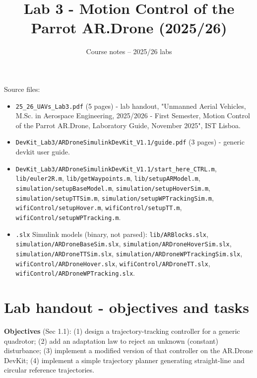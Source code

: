 \documentclass[11pt]{article}
\title{Lab 3 - Motion Control of the Parrot AR.Drone (2025/26)}
\author{Course notes -- 2025/26 labs}
\date{}
\begin{document}
\maketitle
\tableofcontents
\vspace{1em}

Source files:
\begin{itemize}
\item \texttt{25\_\allowbreak{}26\_\allowbreak{}UAVs\_\allowbreak{}Lab3.pdf} (5 pages) - lab handout, "Unmanned Aerial Vehicles, M.Sc. in Aerospace Engineering, 2025/2026 - First Semester, Motion Control of the Parrot AR.Drone, Laboratory Guide, November 2025", IST Lisboa.
\item \texttt{DevKit\_\allowbreak{}Lab3/\allowbreak{}ARDroneSimulinkDevKit\_\allowbreak{}V1.1/guide.pdf} (3 pages) - generic devkit user guide.
\item \texttt{DevKit\_\allowbreak{}Lab3/\allowbreak{}ARDroneSimulinkDevKit\_\allowbreak{}V1.1/start\_\allowbreak{}here\_\allowbreak{}CTRL.m}, \texttt{lib/\allowbreak{}euler2R.m}, \texttt{lib/\allowbreak{}getWaypoints.m}, \texttt{lib/\allowbreak{}setupARModel.m}, \texttt{simulation/\allowbreak{}setupBaseModel.m}, \texttt{simulation/\allowbreak{}setupHoverSim.m}, \texttt{simulation/\allowbreak{}setupTTSim.m}, \texttt{simulation/\allowbreak{}setupWPTrackingSim.m}, \texttt{wifiControl/\allowbreak{}setupHover.m}, \texttt{wifiControl/\allowbreak{}setupTT.m}, \texttt{wifiControl/\allowbreak{}setupWPTracking.m}.
\item \texttt{.slx} Simulink models (binary, not parsed): \texttt{lib/ARBlocks.slx}, \texttt{simulation/\allowbreak{}ARDroneBaseSim.slx}, \texttt{simulation/\allowbreak{}ARDroneHoverSim.slx}, \texttt{simulation/\allowbreak{}ARDroneTTSim.slx}, \texttt{simulation/\allowbreak{}ARDroneWPTrackingSim.slx}, \texttt{wifiControl/\allowbreak{}ARDroneHover.slx}, \texttt{wifiControl/\allowbreak{}ARDroneTT.slx}, \texttt{wifiControl/\allowbreak{}ARDroneWPTracking.slx}.
\end{itemize}

\section{Lab handout - objectives and tasks}

\textbf{Objectives} (Sec 1.1): (1) design a trajectory-tracking controller for a generic quadrotor; (2) add an adaptation law to reject an unknown (constant) disturbance; (3) implement a modified version of that controller on the AR.Drone DevKit; (4) implement a simple trajectory planner generating straight-line and circular reference trajectories.
\end{document}
